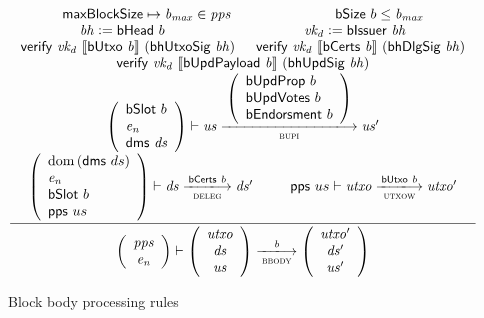 \documentclass[11pt,a4paper]{article}
\DeclareMathOperator{\dom}{dom}
\newcommand{\var}[1]{\mathit{#1}}
\newcommand{\fun}[1]{\mathsf{#1}}
\newcommand{\trans}[2]{\xlongrightarrow[\textsc{#1}]{#2}}
\newcommand{\serialised}[1]{\llbracket \var{#1} \rrbracket}
\newcommand{\leteq}{\ensuremath{\mathrel{\mathop:}=}}
\newcommand{\bsizename}{bSize}
\newcommand{\verifyname}{verify}
\newcommand{\bcertsname}{bCerts}
\newcommand{\bissuername}{bIssuer}
\newcommand{\verify}[3]{\fun{\verifyname} ~ #1 ~ #2 ~ #3}
\newcommand{\bsize}[1]{\fun{\bsizename} ~ #1}
\newcommand{\bcerts}[1]{\fun{\bcertsname} ~ #1}
\newcommand{\bissuer}[1]{\fun{\bissuername} ~ #1}
\begin{document}
\begin{figure}[ht]
  \begin{equation*}
    \inference
    { \maxblocksize \mapsto \var{b_{max}} \in \var{pps} && \bsize{b} \leq \var{b_{max}} \\
      \var{bh} \leteq \bhead{b} & \var{vk_d} \leteq \bissuer{\var{bh}} \\
      \verify{\var{vk_d}}{\serialised{\butxo{b}}}{(\fun{bhUtxoSig}~\var{bh})} &
      \verify{\var{vk_d}}{\serialised{\bcerts{b}}}{(\fun{bhDlgSig}~\var{bh})} \\
      \verify{\var{vk_d}}{\serialised{\bupdpayload{b}}}{(\fun{bhUpdSig}~\var{bh})} \\
      {\left(
          \begin{array}{l}
            \bslot{b} \\
            \var{e_n} \\
            \fun{dms} ~ \var{ds}
          \end{array}
        \right)}
      \vdash \var{us} \trans{bupi}{
        {\left(
            \begin{array}{l}
              \bupdprop{b} \\
              \bupdvotes{b} \\
              \bendorsment{b}
            \end{array}
          \right)}
      } \var{us'}
      \\
      {\left(
          \begin{array}{l}
            \dom{(\fun{dms}~ ds)} \\
            \var{e_n} \\
            \bslot{b} \\
            \fun{pps} ~  us \\
          \end{array}
        \right)}
      \vdash \var{ds} \trans{deleg}{\bcerts{b}} \var{ds'} &
      \fun{pps} ~  us \vdash \var{utxo} \trans{utxow}{\butxo{b}} \var{utxo'} \\
    }
    {
      \left(
        {\begin{array}{c}
           \var{pps} \\
           \var{e_n}
         \end{array}}
     \right)
     \vdash
     {
       \left(
         {\begin{array}{c}
            \var{utxo} \\
            \var{ds} \\
            \var{us}
          \end{array}}
      \right)
    }
    \trans{bbody}{\var{b}}
    {
      \left(
        {\begin{array}{c}
           \var{utxo'} \\
           \var{ds'} \\
           \var{us'}
         \end{array}}
     \right)
   }
 }
\end{equation*}
\caption{Block body processing rules}
\label{fig:rules:bbody}
\end{figure}
\end{document}
